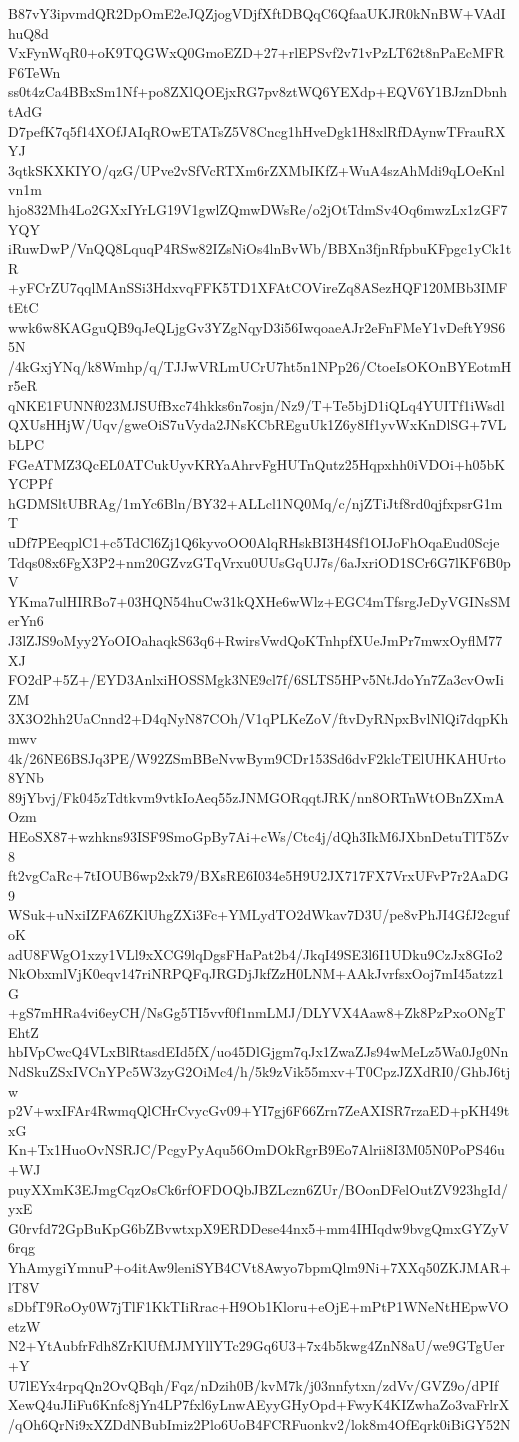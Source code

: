 B87vY3ipvmdQR2DpOmE2eJQZjogVDjfXftDBQqC6QfaaUKJR0kNnBW+VAdIhuQ8d
VxFynWqR0+oK9TQGWxQ0GmoEZD+27+rlEPSvf2v71vPzLT62t8nPaEcMFRF6TeWn
ss0t4zCa4BBxSm1Nf+po8ZXlQOEjxRG7pv8ztWQ6YEXdp+EQV6Y1BJznDbnhtAdG
D7pefK7q5f14XOfJAIqROwETATsZ5V8Cncg1hHveDgk1H8xlRfDAynwTFrauRXYJ
3qtkSKXKIYO/qzG/UPve2vSfVcRTXm6rZXMbIKfZ+WuA4szAhMdi9qLOeKnlvn1m
hjo832Mh4Lo2GXxIYrLG19V1gwlZQmwDWsRe/o2jOtTdmSv4Oq6mwzLx1zGF7YQY
iRuwDwP/VnQQ8LquqP4RSw82IZsNiOs4lnBvWb/BBXn3fjnRfpbuKFpgc1yCk1tR
+yFCrZU7qqlMAnSSi3HdxvqFFK5TD1XFAtCOVireZq8ASezHQF120MBb3IMFtEtC
wwk6w8KAGguQB9qJeQLjgGv3YZgNqyD3i56IwqoaeAJr2eFnFMeY1vDeftY9S65N
/4kGxjYNq/k8Wmhp/q/TJJwVRLmUCrU7ht5n1NPp26/CtoeIsOKOnBYEotmHr5eR
qNKE1FUNNf023MJSUfBxc74hkks6n7osjn/Nz9/T+Te5bjD1iQLq4YUITf1iWsdl
QXUsHHjW/Uqv/gweOiS7uVyda2JNsKCbREguUk1Z6y8If1yvWxKnDlSG+7VLbLPC
FGeATMZ3QcEL0ATCukUyvKRYaAhrvFgHUTnQutz25Hqpxhh0iVDOi+h05bKYCPPf
hGDMSltUBRAg/1mYc6Bln/BY32+ALLcl1NQ0Mq/c/njZTiJtf8rd0qjfxpsrG1mT
uDf7PEeqplC1+c5TdCl6Zj1Q6kyvoOO0AlqRHskBI3H4Sf1OIJoFhOqaEud0Scje
Tdqs08x6FgX3P2+nm20GZvzGTqVrxu0UUsGqUJ7s/6aJxriOD1SCr6G7lKF6B0pV
YKma7ulHIRBo7+03HQN54huCw31kQXHe6wWlz+EGC4mTfsrgJeDyVGINsSMerYn6
J3lZJS9oMyy2YoOIOahaqkS63q6+RwirsVwdQoKTnhpfXUeJmPr7mwxOyflM77XJ
FO2dP+5Z+/EYD3AnlxiHOSSMgk3NE9cl7f/6SLTS5HPv5NtJdoYn7Za3cvOwIiZM
3X3O2hh2UaCnnd2+D4qNyN87COh/V1qPLKeZoV/ftvDyRNpxBvlNlQi7dqpKhmwv
4k/26NE6BSJq3PE/W92ZSmBBeNvwBym9CDr153Sd6dvF2klcTElUHKAHUrto8YNb
89jYbvj/Fk045zTdtkvm9vtkIoAeq55zJNMGORqqtJRK/nn8ORTnWtOBnZXmAOzm
HEoSX87+wzhkns93ISF9SmoGpBy7Ai+cWs/Ctc4j/dQh3IkM6JXbnDetuTlT5Zv8
ft2vgCaRc+7tIOUB6wp2xk79/BXsRE6I034e5H9U2JX717FX7VrxUFvP7r2AaDG9
WSuk+uNxiIZFA6ZKlUhgZXi3Fc+YMLydTO2dWkav7D3U/pe8vPhJI4GfJ2cgufoK
adU8FWgO1xzy1VLl9xXCG9lqDgsFHaPat2b4/JkqI49SE3l6I1UDku9CzJx8GIo2
NkObxmlVjK0eqv147riNRPQFqJRGDjJkfZzH0LNM+AAkJvrfsxOoj7mI45atzz1G
+gS7mHRa4vi6eyCH/NsGg5TI5vvf0f1nmLMJ/DLYVX4Aaw8+Zk8PzPxoONgTEhtZ
hbIVpCwcQ4VLxBlRtasdEId5fX/uo45DlGjgm7qJx1ZwaZJs94wMeLz5Wa0Jg0Nn
NdSkuZSxIVCnYPc5W3zyG2OiMc4/h/5k9zVik55mxv+T0CpzJZXdRI0/GhbJ6tjw
p2V+wxIFAr4RwmqQlCHrCvycGv09+YI7gj6F66Zrn7ZeAXISR7rzaED+pKH49txG
Kn+Tx1HuoOvNSRJC/PcgyPyAqu56OmDOkRgrB9Eo7Alrii8I3M05N0PoPS46u+WJ
puyXXmK3EJmgCqzOsCk6rfOFDOQbJBZLczn6ZUr/BOonDFelOutZV923hgId/yxE
G0rvfd72GpBuKpG6bZBvwtxpX9ERDDese44nx5+mm4IHIqdw9bvgQmxGYZyV6rqg
YhAmygiYmnuP+o4itAw9leniSYB4CVt8Awyo7bpmQlm9Ni+7XXq50ZKJMAR+lT8V
sDbfT9RoOy0W7jTlF1KkTIiRrac+H9Ob1Kloru+eOjE+mPtP1WNeNtHEpwVOetzW
N2+YtAubfrFdh8ZrKlUfMJMYllYTc29Gq6U3+7x4b5kwg4ZnN8aU/we9GTgUer+Y
U7lEYx4rpqQn2OvQBqh/Fqz/nDzih0B/kvM7k/j03nnfytxn/zdVv/GVZ9o/dPIf
XewQ4uJIiFu6Knfc8jYn4LP7fxl6yLnwAEyyGHyOpd+FwyK4KIZwhaZo3vaFrlrX
/qOh6QrNi9xXZDdNBubImiz2Plo6UoB4FCRFuonkv2/lok8m4OfEqrk0iBiGY52N
